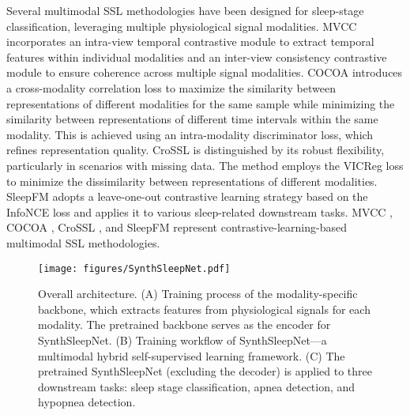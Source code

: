 Several multimodal SSL methodologies have been designed for sleep-stage classification, leveraging multiple physiological signal modalities. MVCC \cite{ref20} incorporates an intra-view temporal contrastive module to extract temporal features within individual modalities and an inter-view consistency contrastive module to ensure coherence across multiple signal modalities. COCOA \cite{ref21} introduces a cross-modality correlation loss to maximize the similarity between representations of different modalities for the same sample while minimizing the similarity between representations of different time intervals within the same modality. This is achieved using an intra-modality discriminator loss, which refines representation quality. CroSSL \cite{ref22} is distinguished by its robust flexibility, particularly in scenarios with missing data. The method employs the VICReg loss to minimize the dissimilarity between representations of different modalities. SleepFM \cite{ref23} adopts a leave-one-out contrastive learning strategy based on the InfoNCE loss and applies it to various sleep-related downstream tasks. MVCC \cite{ref20}, COCOA \cite{ref21}, CroSSL \cite{ref22}, and SleepFM \cite{ref23} represent contrastive-learning-based multimodal SSL methodologies.


\begin{figure*}[!t]
\centering
\texttt{[image: figures/SynthSleepNet.pdf]}
\caption{Overall architecture. (A) Training process of the modality-specific backbone, which extracts features from physiological signals for each modality. The pretrained backbone serves as the encoder for SynthSleepNet. (B) Training workflow of SynthSleepNet—a multimodal hybrid self-supervised learning framework. (C) The pretrained SynthSleepNet (excluding the decoder) is applied to three downstream tasks: sleep stage classification, apnea detection, and hypopnea detection.}
\label{fig:figure1}
\end{figure*}